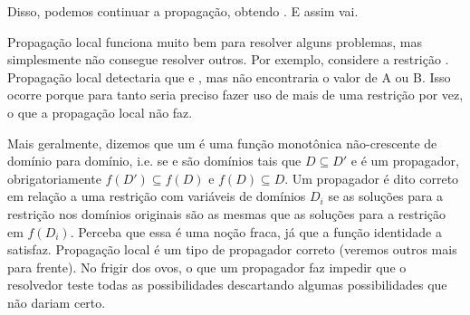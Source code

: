 \documentclass{article}
\begin{document}
\begin{center}
\end{center}

Disso, podemos continuar a propagação, obtendo . E
assim vai.

Propagação local funciona muito bem para resolver alguns problemas,
mas simplesmente não consegue resolver outros. Por exemplo, considere
a restrição . Propagação local
detectaria que  e , mas não encontraria o
valor de A ou B. Isso ocorre porque para tanto seria preciso fazer uso
de mais de uma restrição por vez, o que a propagação local não faz.

Mais geralmente, dizemos que um  é uma função
monotônica não-crescente de domínio para domínio, i.e. se 
e  são domínios tais que $D \subseteq D'$ e 
é um propagador, obrigatoriamente $f(D') \subseteq f(D)$ e $f(D)
\subseteq D$. Um propagador é dito correto em relação a uma restrição
 com variáveis de domínios $D_i$ se as soluções para a
restrição nos domínios originais são as mesmas que as soluções para a
restrição em $f(D_i)$.  Perceba que essa é uma noção fraca, já que a
função identidade a satisfaz. Propagação local é um tipo de propagador
correto (veremos outros mais para frente). No frigir dos ovos, o que
um propagador faz impedir que o resolvedor teste todas as
possibilidades descartando algumas possibilidades que não dariam
certo.
\end{document}

